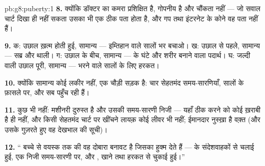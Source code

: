 \begin{solution}{pb:g8:puberty:1}
\textbf{8.} क्योंकि डॉक्टर का कमरा प्रशिक्षित है, गोपनीय है और चौंकता
नहीं --- जो सवाल चार्ट दिखा ही नहीं सकता उसका भी एक ठीक पता होता है, और
गप तथा इंटरनेट के कोने वह पता नहीं हैं।

\textbf{9.} क: उछाल ख़त्म होती हुई, सामान्य --- इम्तिहान वाले सालों भर
 बचाओ। ख: उछाल से पहले, सामान्य --- सब्र और थाली। ग: उछाल के बीच,
सामान्य ---  के घंटे और शरीर बनाने वाला पदार्थ। घ: जल्दी वाली उछाल
पूरी, सामान्य --- भरने वाले सालों के लिए हरकत।

\textbf{10.} क्योंकि सामान्य कोई लकीर नहीं, एक चौड़ी सड़क है: चार सेहतमंद
समय-सारणियाँ, सालों के फ़ासले पर, और सब पहुँच रही हैं।

\textbf{11.} कुछ भी नहीं: मशीनरी दुरुस्त है और उसकी समय-सारणी निजी ---
यहाँ ठीक करने को कोई ख़राबी है ही नहीं, और किसी सेहतमंद चार्ट पर खींचने
लायक़ कोई लीवर भी नहीं; ईमानदार नुस्ख़ा है वक़्त (और उसके गुज़रते हुए वह
देखभाल की सूची)।

\textbf{12.} `` बच्चे से वयस्क तक की वह दोबारा बनावट है जिसका
हुक्म  देते हैं ---  के संदेशवाहकों से चलाई हुई, एक निजी
समय-सारणी पर, और , खाने तथा हरकत से चुकाई हुई।''
\end{solution}
